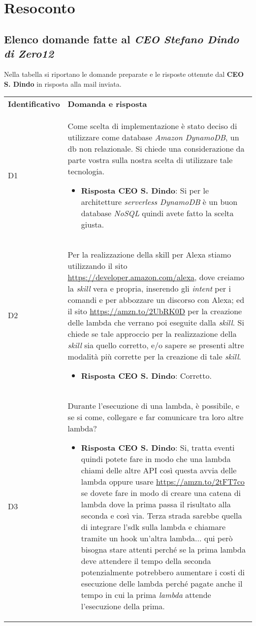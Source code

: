 \clearpage
\section{Resoconto}
	\subsection{Elenco domande fatte al \emph{CEO Stefano Dindo di Zero12}}
	\label{sec:elenco}
	Nella tabella si riportano le domande preparate e le risposte ottenute dal \textbf{CEO S. Dindo} in risposta alla mail inviata.
		\begin{center}
			\renewcommand{\arraystretch}{1.5}
			\begin{longtable}{  p{2.5cm} p{11.7cm} }
				\rowcolor{tableHeadYellow}
				\textbf{Identificativo}&\textbf{Domanda e risposta}\\
				D1 & Come scelta di implementazione è stato deciso di utilizzare come database \textit{Amazon DynamoDB}, un db non relazionale. Si chiede una considerazione da parte vostra sulla nostra scelta di utilizzare tale tecnologia.
				\begin{itemize}
					\item \textbf{Risposta CEO S. Dindo}: Si per le architetture \textit{serverless DynamoDB} è un buon database \textit{NoSQL} quindi avete fatto la scelta giusta. 
				\end{itemize}
				\\
				D2 & Per la realizzazione della skill per Alexa stiamo utilizzando il sito \href{https://developer.amazon.com/alexa}{https://developer.amazon.com/alexa}, dove creiamo la \textit{skill} vera e propria, inserendo gli \textit{intent} per i comandi e per abbozzare un discorso con Alexa;
				ed il sito \href{https://amzn.to/2UbRK0D}{https://amzn.to/2UbRK0D} per la creazione delle lambda che verrano poi eseguite dalla \textit{skill}.
				Si chiede se tale approccio per la realizzazione della \textit{skill} sia quello corretto, e/o sapere se presenti altre modalità più corrette per la creazione di tale \textit{skill}.
				\begin{itemize}
					\item \textbf{Risposta CEO S. Dindo}: Corretto.
				\end{itemize}
				\\
				D3 & Durante l'esecuzione di una lambda, è possibile, e se si come, collegare e far comunicare tra loro altre lambda? 
				\begin{itemize}
					\item \textbf{Risposta CEO S. Dindo}: Si, tratta eventi quindi potete fare in modo che una lambda chiami delle altre API così questa avvia delle lambda oppure usare \href{https://amzn.to/2tFT7co}{https://amzn.to/2tFT7co} se dovete fare in modo di creare una catena di lambda dove la prima passa il risultato alla seconda e così via. Terza strada sarebbe quella di integrare l'sdk sulla lambda e chiamare tramite un hook un'altra lambda... qui però bisogna stare attenti perché se la prima lambda deve attendere il tempo della seconda potenzialmente potrebbero aumentare i costi di esecuzione delle lambda perché pagate anche il tempo in cui la prima \textit{lambda} attende l'esecuzione della prima.

\end{itemize}
\end{longtable}
\end{center}
